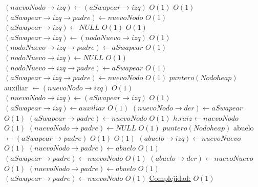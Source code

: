 \begin{Algoritmos}
\begin{algorithmic}[1]
								\State $(nuevoNodo \rightarrow izq) \gets (aSwapear \rightarrow izq)$ \Comment $O(1)$
								 \Comment $O(1)$
									\State $(aSwapear \rightarrow izq \rightarrow padre) \gets nuevoNodo$	\Comment $O(1)$						
								\EndIf
								\State $(aSwapear \rightarrow izq) \gets NULL$ \Comment $O(1)$
							\Else
								 \Comment $O(1)$
									\State $(aSwapear \rightarrow izq) \gets (nodoNuevo \rightarrow izq)$ \Comment $O(1)$
									\State $(nodoNuevo \rightarrow izq \rightarrow padre) \gets aSwapear$ \Comment $O(1)$
									\State $(nodoNuevo \rightarrow izq) \gets NULL$ \Comment $O(1)$
								\Else
									\State $(nodoNuevo \rightarrow izq \rightarrow padre) \gets aSwapear$ \Comment $O(1)$
									\State $(aSwapear \rightarrow izq \rightarrow padre) \gets nuevoNodo$ \Comment $O(1)$
									\State $puntero(Nodoheap)$ auxiliar $\gets (nuevoNodo \rightarrow izq)$ \Comment $O(1)$
									\State $(nuevoNodo \rightarrow izq) \gets (aSwapear \rightarrow izq)$ \Comment $O(1)$
									\State $(aSwapear \rightarrow izq) \gets auxiliar$ \Comment $O(1)$
								\EndIf
							\EndIf
						\State $(nuevoNodo \rightarrow der) \gets aSwapear$ \Comment $O(1)$
					\EndIf	
					\State $(aSwapear \rightarrow padre) \gets nuevoNodo$ \Comment $O(1)$
					\State $h.raiz \gets nuevoNodo$	 \Comment $O(1)$
					\State $(nuevoNodo \rightarrow padre) \gets NULL$			 \Comment $O(1)$
					\Else
					\State $puntero(Nodoheap)$ abuelo $\gets (aSwapear \rightarrow padre)$ \Comment $O(1)$
						 \Comment $O(1)$
							\State $(abuelo \rightarrow izq) \gets nuevoNuevo$ \Comment $O(1)$
							\State $(nuevoNodo \rightarrow padre) \gets abuelo$ \Comment $O(1)$
							\State $(aSwapear \rightarrow padre) \gets nuevoNodo$ \Comment $O(1)$
						\Else
							\State $(abuelo \rightarrow der) \gets nuevoNuevo$ \Comment $O(1)$
							\State $(nuevoNodo \rightarrow padre) \gets abuelo$ \Comment $O(1)$
							\State $(aSwapear \rightarrow padre) \gets nuevoNodo$ \Comment $O(1)$
						\EndIf
					\EndIf
			\medskip
			\Statex \underline{Complejidad:} $O(1)$
    	\end{algorithmic}   
    	

\end{Algoritmos}
